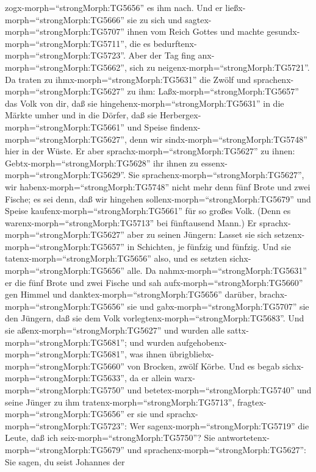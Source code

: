 zogx-morph=``strongMorph:TG5656'' es ihm nach. Und er
ließx-morph=``strongMorph:TG5666'' sie zu sich und
sagtex-morph=``strongMorph:TG5707'' ihnen vom Reich Gottes und machte
gesundx-morph=``strongMorph:TG5711'', die es
bedurftenx-morph=``strongMorph:TG5723''. Aber der Tag fing
anx-morph=``strongMorph:TG5662'', sich zu
neigenx-morph=``strongMorph:TG5721''.  Da traten zu
ihmx-morph=``strongMorph:TG5631'' die Zwölf und
sprachenx-morph=``strongMorph:TG5627'' zu ihm:
Laßx-morph=``strongMorph:TG5657'' das Volk von dir, daß sie
hingehenx-morph=``strongMorph:TG5631'' in die Märkte umher und in die
Dörfer, daß sie Herbergex-morph=``strongMorph:TG5661'' und Speise
findenx-morph=``strongMorph:TG5627'', denn wir
sindx-morph=``strongMorph:TG5748'' hier in der Wüste.  Er
aber sprachx-morph=``strongMorph:TG5627'' zu ihnen:
Gebtx-morph=``strongMorph:TG5628'' ihr ihnen zu
essenx-morph=``strongMorph:TG5629''. Sie
sprachenx-morph=``strongMorph:TG5627'', wir
habenx-morph=``strongMorph:TG5748'' nicht mehr denn fünf Brote und zwei
Fische; es sei denn, daß wir hingehen
sollenx-morph=``strongMorph:TG5679'' und Speise
kaufenx-morph=``strongMorph:TG5661'' für so großes Volk. 
(Denn es warenx-morph=``strongMorph:TG5713'' bei fünftausend Mann.) Er
sprachx-morph=``strongMorph:TG5627'' aber zu seinen Jüngern: Lasset sie
sich setzenx-morph=``strongMorph:TG5657'' in Schichten, je fünfzig und
fünfzig.  Und sie tatenx-morph=``strongMorph:TG5656'' also,
und es setzten sichx-morph=``strongMorph:TG5656'' alle.  Da
nahmx-morph=``strongMorph:TG5631'' er die fünf Brote und zwei Fische und
sah aufx-morph=``strongMorph:TG5660'' gen Himmel und
danktex-morph=``strongMorph:TG5656'' darüber,
brachx-morph=``strongMorph:TG5656'' sie und
gabx-morph=``strongMorph:TG5707'' sie den Jüngern, daß sie dem Volk
vorlegtenx-morph=``strongMorph:TG5683''.  Und sie
aßenx-morph=``strongMorph:TG5627'' und wurden alle
sattx-morph=``strongMorph:TG5681''; und wurden
aufgehobenx-morph=``strongMorph:TG5681'', was ihnen
übrigbliebx-morph=``strongMorph:TG5660'' von Brocken, zwölf Körbe.
 Und es begab sichx-morph=``strongMorph:TG5633'', da er
allein warx-morph=``strongMorph:TG5750'' und
betetex-morph=``strongMorph:TG5740'' und seine Jünger zu ihm
tratenx-morph=``strongMorph:TG5713'',
fragtex-morph=``strongMorph:TG5656'' er sie und
sprachx-morph=``strongMorph:TG5723'': Wer
sagenx-morph=``strongMorph:TG5719'' die Leute, daß ich
seix-morph=``strongMorph:TG5750''?  Sie
antwortetenx-morph=``strongMorph:TG5679'' und
sprachenx-morph=``strongMorph:TG5627'': Sie sagen, du seist Johannes der
